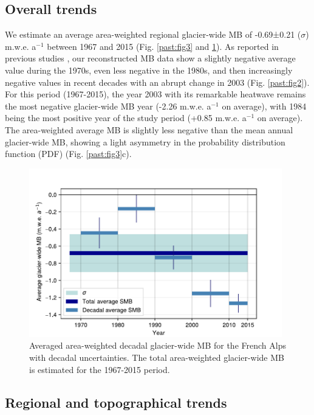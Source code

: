 {\subsection{Overall trends} \label{past:overview:overall}

We estimate an average area-weighted regional glacier-wide MB of -0.69±0.21 ($\sigma$) m.w.e. a$^{-1}$ between 1967 and 2015 (Fig. \ref{past:fig3} and \ref{past:fig4}). As reported in previous studies \citep{huss_extrapolating_2012, rabatel_spatio-temporal_2016, vincent_common_2017}, our reconstructed MB data show a slightly negative average value during the 1970s, even less negative in the 1980s, and then increasingly negative values in recent decades with an abrupt change in 2003 (Fig. \ref{past:fig2}). For this period (1967-2015), the year 2003 with its remarkable heatwave remains the most negative glacier-wide MB year (-2.26 m.w.e. a$^{-1}$ on average), with 1984 being the most positive year of the study period (+0.85 m.w.e. a$^{-1}$ on average). The area-weighted average MB is slightly less negative than the mean annual glacier-wide MB, showing a light asymmetry in the probability distribution function (PDF) (Fig. \ref{past:fig3}c). 

\begin{figure}[t]
\centering
\includegraphics[width=11cm]{Figures/past/Figure_4.pdf}
\captionsetup{justification=centering}
\caption{Averaged area-weighted decadal glacier-wide MB for the French Alps with decadal uncertainties.  The total area-weighted glacier-wide MB is estimated for the 1967-2015 period.}
\label{past:fig4}
\end{figure}

\subsection{Regional and topographical trends} \label{past:overview:regional}

}
